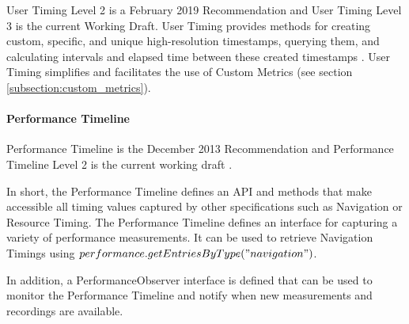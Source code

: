 User Timing Level 2 is a February 2019 Recommendation and User Timing Level 3 is the current Working Draft.
User Timing provides methods for creating custom, specific, and unique high-resolution timestamps, querying them, and calculating intervals and elapsed time between these created timestamps \cite{2021W3CUserTiming}.
User Timing simplifies and facilitates the use of Custom Metrics (see section \ref{subsection:custom_metrics}).




\paragraph{Performance Timeline} %

Performance Timeline is the December 2013 Recommendation \cite{2013W3CPerformanceTimeline} and Performance Timeline Level 2 is the current working draft \cite{2021W3CPerformanceTimelineLevel2}.

In short, the Performance Timeline defines an API and methods that make accessible all timing values captured by other specifications such as Navigation or Resource Timing.
The Performance Timeline defines an interface for capturing a variety of performance measurements. 
It can be used to retrieve Navigation Timings using $performance.getEntriesByType("navigation")$.

In addition, a PerformanceObserver interface is defined that can be used to monitor the Performance Timeline and notify when new measurements and recordings are available.



	
